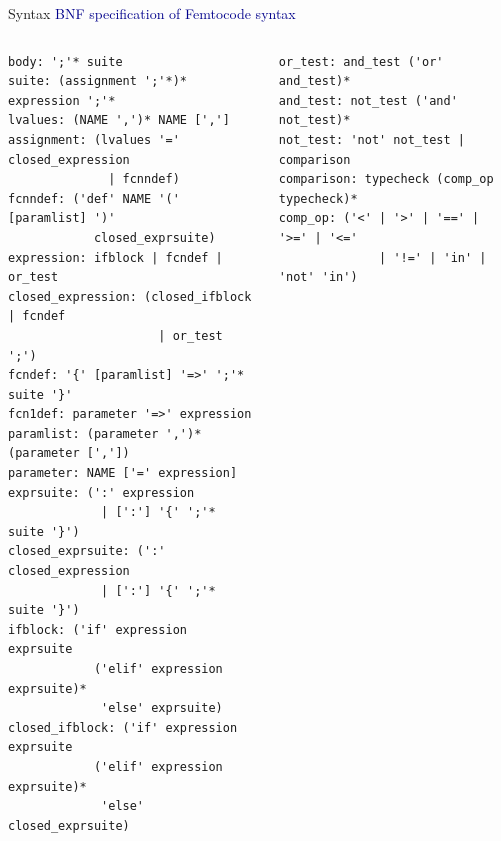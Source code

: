\documentclass{beamer}
\begin{document}
\begin{frame}[fragile]{Syntax}
\vspace{0.25 cm}
\textcolor{darkblue}{BNF specification of Femtocode syntax} 

\vspace{-0.5 cm}
\begin{columns}[t]
\tiny
\begin{verbatim}
body: ';'* suite
suite: (assignment ';'*)* expression ';'*
lvalues: (NAME ',')* NAME [',']
assignment: (lvalues '=' closed_expression
              | fcnndef)
fcnndef: ('def' NAME '(' [paramlist] ')'
            closed_exprsuite)
expression: ifblock | fcndef | or_test
closed_expression: (closed_ifblock | fcndef
                     | or_test ';')
fcndef: '{' [paramlist] '=>' ';'* suite '}'
fcn1def: parameter '=>' expression
paramlist: (parameter ',')* (parameter [','])
parameter: NAME ['=' expression]
exprsuite: (':' expression
             | [':'] '{' ';'* suite '}')
closed_exprsuite: (':' closed_expression
             | [':'] '{' ';'* suite '}')
ifblock: ('if' expression exprsuite
            ('elif' expression exprsuite)*
             'else' exprsuite)
closed_ifblock: ('if' expression exprsuite
            ('elif' expression exprsuite)*
             'else' closed_exprsuite)
\end{verbatim}
\vspace{-0.8 cm}
\begin{verbatim}
or_test: and_test ('or' and_test)*
and_test: not_test ('and' not_test)*
not_test: 'not' not_test | comparison
comparison: typecheck (comp_op typecheck)*
comp_op: ('<' | '>' | '==' | '>=' | '<='
              | '!=' | 'in' | 'not' 'in')
\end{verbatim}


\end{columns}
\end{frame}
\end{document}
